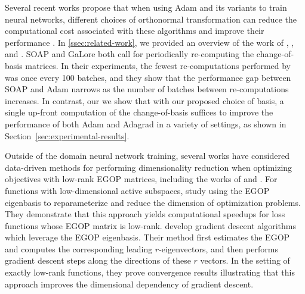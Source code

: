 Several recent works propose that when using Adam and its variants to train neural networks,  different choices of orthonormal transformation can reduce the computational cost associated with these algorithms and improve their performance \cite{vyas2024soap, maes2024understanding, zhao2024galore}. In \cref{ssec:related-work}, we provided an overview of the work of \citet{vyas2024soap}, \citet{zhao2024galore}, and \citet{maes2024understanding}. SOAP and GaLore both call for periodically re-computing the change-of-basis matrices. In their experiments, the fewest re-computations performed by \citet{vyas2024soap} was once every 100 batches, and they show that the performance gap between SOAP and Adam narrows as the number of batches between re-computations increases. In contrast, our we show that with our proposed choice of basis, a single up-front computation of the change-of-basis suffices to improve the performance of both Adam and Adagrad in a variety of settings, as shown in Section~\ref{sec:experimental-results}.

Outside of the domain neural network training, several works have considered data-driven methods for performing dimensionality reduction when optimizing objectives with low-rank EGOP matrices, including the works of \citet{cartis2024learning} and \citet{cosson2023low}. For functions with low-dimensional active subspaces, \citet{cartis2024learning} study using the EGOP eigenbasis to reparameterize and reduce the dimension of optimization problems. They demonstrate that this approach yields computational speedups for loss functions whose EGOP matrix is low-rank. \citet{cosson2023low} develop gradient descent algorithms which leverage the EGOP eigenbasis. Their method first estimates the EGOP and computes the corresponding leading $r$-eigenvectors, and then performs gradient descent steps along the directions of these $r$ vectors. In the setting of exactly low-rank functions, they prove convergence results illustrating that this approach improves the dimensional dependency of gradient descent.  